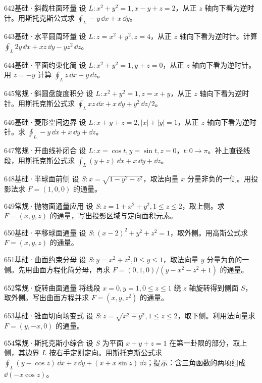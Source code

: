 \begin{exercise}{642}{基础·斜截柱面环量}
设 $L:x^2+y^2=1,x-y+z=2$，从正 $z$ 轴向下看为逆时针。用斯托克斯公式求 $\oint_L-y\,\dd x+x\,\dd y$。
\end{exercise}
\begin{exercise}{643}{基础·水平圆周环量}
设 $L:z=x^2+y^2,z=4$，从正 $z$ 轴向下看为逆时针。计算 $\oint_L2y\,\dd x+xz\,\dd y-yz^2\,\dd z$。
\end{exercise}
\begin{exercise}{644}{基础·平面约束化简}
设 $L:x^2+y^2=1,y+z=0$，从正 $z$ 轴向下看为逆时针。用 $z=-y$ 计算 $\oint_Lz\,\dd x+y\,\dd z$。
\end{exercise}
\begin{exercise}{645}{常规·斜圆盘旋度积分}
设 $L:x^2+y^2=1,z=x+y$，从正 $z$ 轴向下看为逆时针。用斯托克斯公式求 $\oint_Lxz\,\dd x+x\,\dd y+y^2\,\dd z/2$。
\end{exercise}
\begin{exercise}{646}{基础·菱形空间边界}
设 $L:x+y+z=2,|x|+|y|=1$，从正 $z$ 轴向下看为逆时针。求 $\oint_L-y\,\dd x+x\,\dd y+\dd z$。
\end{exercise}
\begin{exercise}{647}{常规·开曲线补闭合}
设 $L:x=\cos t,y=\sin t,z=0$，$t:0\to\pi$。补上直径线段，用斯托克斯公式求 $\int_L(y+z)\,\dd x+x\,\dd y+\dd z$。
\end{exercise}
\begin{exercise}{648}{基础·半球面前侧}
设 $S:x=\sqrt{1-y^2-z^2}$，取法向量 $x$ 分量非负的一侧。用投影法求 $F=(1,0,0)$ 的通量。
\end{exercise}
\begin{exercise}{649}{常规·抛物面通量应用}
设 $S:z=1+x^2+y^2,1\leq z\leq2$，取上侧。求 $F=(x,y,z)$ 的通量，写出投影区域与定向面积元素。
\end{exercise}
\begin{exercise}{650}{基础·平移球面通量}
设 $S:(x-2)^2+y^2+z^2=1$，取外侧。用高斯公式求 $F=(x,y,z)$ 的通量。
\end{exercise}
\begin{exercise}{651}{基础·曲面约束分母}
设 $S:y=x^2+z^2,0\leq y\leq1$，取法向量 $y$ 分量为负的一侧。先用曲面方程化简分母，再求 $F=(0,1,0)/(y-x^2-z^2+1)$ 的通量。
\end{exercise}
\begin{exercise}{652}{常规·旋转曲面通量}
将线段 $x=0,y=1,0\leq z\leq1$ 绕 $z$ 轴旋转得到侧面 $S$，取外侧。写出曲面方程并求 $F=(x,y,z^2)$ 的通量。
\end{exercise}
\begin{exercise}{653}{基础·锥面切向场变式}
设 $S:z=\sqrt{x^2+y^2},1\leq z\leq2$，取下侧。利用法向量求 $F=(y,-x,0)$ 的通量。
\end{exercise}
\begin{exercise}{654}{常规·斯托克斯小综合}
设 $S$ 为平面 $x+y+z=1$ 在第一卦限的部分，取上侧，其边界 $L$ 按右手定则定向。用斯托克斯公式求 $\oint_L(y-\cos z)\,\dd x+z\,\dd y+(x+x\sin z)\,\dd z$；提示：含三角函数的两项组成 $\dd(-x\cos z)$。
\end{exercise}
